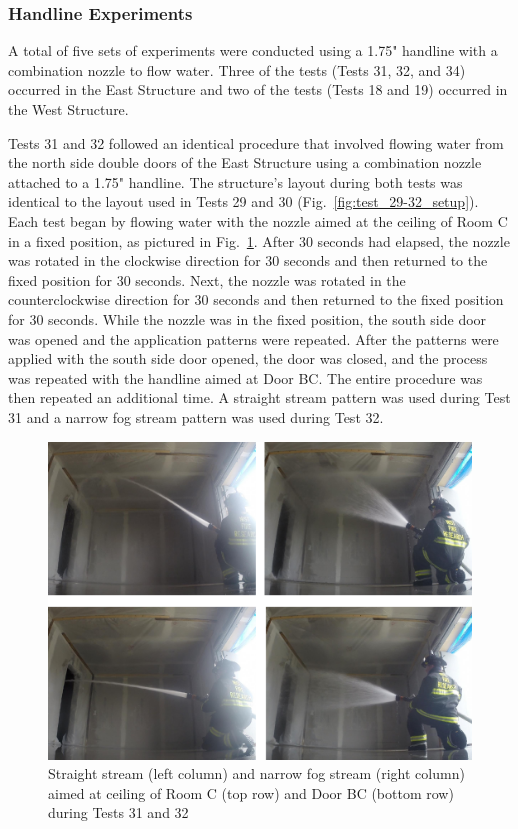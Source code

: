 \documentclass[12pt,oneside]{book}
\begin{document}
\clearpage

\subsubsection{Handline Experiments}
\label{sec:Water_Flow_Handline_Procedure}
A total of five sets of experiments were conducted using a 1.75" handline with a combination nozzle to flow water. Three of the tests (Tests 31, 32, and 34) occurred in the East Structure and two of the tests (Tests 18 and 19) occurred in the West Structure. 

Tests 31 and 32 followed an identical procedure that involved flowing water from the north side double doors of the East Structure using a combination nozzle attached to a 1.75" handline. The structure's layout during both tests was identical to the layout used in Tests 29 and 30 (Fig.~\ref{fig:test_29-32_setup}). Each test began by flowing water with the nozzle aimed at the ceiling of Room C in a fixed position, as pictured in Fig.~\ref{fig:test_31_32_pic}. After 30 seconds had elapsed, the nozzle was rotated in the clockwise direction for 30 seconds and then returned to the fixed position for 30 seconds. Next, the nozzle was rotated in the counterclockwise direction for 30 seconds and then returned to the fixed position for 30 seconds. While the nozzle was in the fixed position, the south side door was opened and the application patterns were repeated. After the patterns were applied with the south side door opened, the door was closed, and the process was repeated with the handline aimed at Door BC. The entire procedure was then repeated an additional time. A straight stream pattern was used during Test 31 and a narrow fog stream pattern was used during Test 32.

\begin{figure}[!ht]
\includegraphics[width=6in]{../Pictures/East_handline_C_BC.pdf}
\caption[Straight Stream and Narrow Fog Stream during Tests 31 and 32]{Straight stream (left column) and narrow fog stream (right column) aimed at ceiling of Room C (top row) and Door BC (bottom row) during Tests 31 and 32}
\label{fig:test_31_32_pic}
\end{figure}
\FloatBarrier
\end{document}
